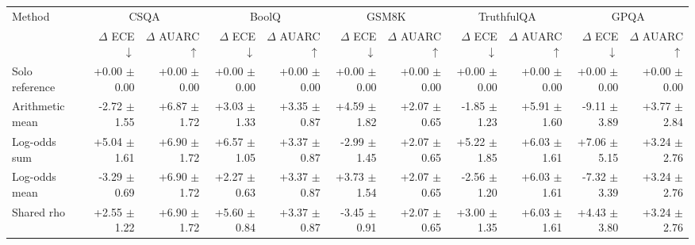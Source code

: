 \begin{tabular}{lrrrrrrrrrr}
\toprule
Method & \multicolumn{2}{c}{CSQA} & \multicolumn{2}{c}{BoolQ} & \multicolumn{2}{c}{GSM8K} & \multicolumn{2}{c}{TruthfulQA} & \multicolumn{2}{c}{GPQA} \\
 & $\Delta$ ECE $\downarrow$ & $\Delta$ AUARC $\uparrow$ & $\Delta$ ECE $\downarrow$ & $\Delta$ AUARC $\uparrow$ & $\Delta$ ECE $\downarrow$ & $\Delta$ AUARC $\uparrow$ & $\Delta$ ECE $\downarrow$ & $\Delta$ AUARC $\uparrow$ & $\Delta$ ECE $\downarrow$ & $\Delta$ AUARC $\uparrow$ \\
\midrule
Solo reference & +0.00 {\scriptsize $\pm$ 0.00} & +0.00 {\scriptsize $\pm$ 0.00} & +0.00 {\scriptsize $\pm$ 0.00} & +0.00 {\scriptsize $\pm$ 0.00} & +0.00 {\scriptsize $\pm$ 0.00} & +0.00 {\scriptsize $\pm$ 0.00} & +0.00 {\scriptsize $\pm$ 0.00} & +0.00 {\scriptsize $\pm$ 0.00} & +0.00 {\scriptsize $\pm$ 0.00} & +0.00 {\scriptsize $\pm$ 0.00} \\
Arithmetic mean & -2.72 {\scriptsize $\pm$ 1.55} & +6.87 {\scriptsize $\pm$ 1.72} & +3.03 {\scriptsize $\pm$ 1.33} & +3.35 {\scriptsize $\pm$ 0.87} & +4.59 {\scriptsize $\pm$ 1.82} & +2.07 {\scriptsize $\pm$ 0.65} & -1.85 {\scriptsize $\pm$ 1.23} & +5.91 {\scriptsize $\pm$ 1.60} & -9.11 {\scriptsize $\pm$ 3.89} & +3.77 {\scriptsize $\pm$ 2.84} \\
Log-odds sum & +5.04 {\scriptsize $\pm$ 1.61} & +6.90 {\scriptsize $\pm$ 1.72} & +6.57 {\scriptsize $\pm$ 1.05} & +3.37 {\scriptsize $\pm$ 0.87} & -2.99 {\scriptsize $\pm$ 1.45} & +2.07 {\scriptsize $\pm$ 0.65} & +5.22 {\scriptsize $\pm$ 1.85} & +6.03 {\scriptsize $\pm$ 1.61} & +7.06 {\scriptsize $\pm$ 5.15} & +3.24 {\scriptsize $\pm$ 2.76} \\
Log-odds mean & -3.29 {\scriptsize $\pm$ 0.69} & +6.90 {\scriptsize $\pm$ 1.72} & +2.27 {\scriptsize $\pm$ 0.63} & +3.37 {\scriptsize $\pm$ 0.87} & +3.73 {\scriptsize $\pm$ 1.54} & +2.07 {\scriptsize $\pm$ 0.65} & -2.56 {\scriptsize $\pm$ 1.20} & +6.03 {\scriptsize $\pm$ 1.61} & -7.32 {\scriptsize $\pm$ 3.39} & +3.24 {\scriptsize $\pm$ 2.76} \\
Shared rho & +2.55 {\scriptsize $\pm$ 1.22} & +6.90 {\scriptsize $\pm$ 1.72} & +5.60 {\scriptsize $\pm$ 0.84} & +3.37 {\scriptsize $\pm$ 0.87} & -3.45 {\scriptsize $\pm$ 0.91} & +2.07 {\scriptsize $\pm$ 0.65} & +3.00 {\scriptsize $\pm$ 1.35} & +6.03 {\scriptsize $\pm$ 1.61} & +4.43 {\scriptsize $\pm$ 3.80} & +3.24 {\scriptsize $\pm$ 2.76} \\

\end{tabular}
